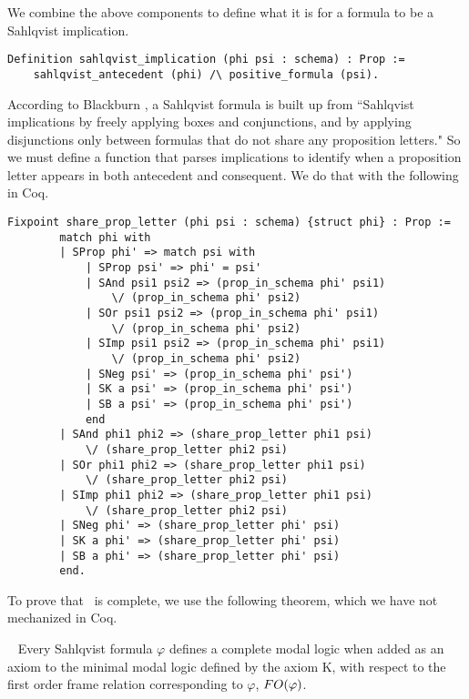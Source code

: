We combine the above components to define what it is for a formula to be a Sahlqvist implication.

\begin{tcolorbox}
	\begin{lstlisting}[language=Coq]
Definition sahlqvist_implication (phi psi : schema) : Prop :=
	sahlqvist_antecedent (phi) /\ positive_formula (psi).

\end{lstlisting}
\end{tcolorbox}

According to Blackburn \etal\cite{modal}, a Sahlqvist formula is built up from ``Sahlqvist implications by freely applying boxes and conjunctions, and by applying disjunctions only between formulas that do not share any proposition letters." So we must define a function that parses implications to identify when a proposition letter appears in both antecedent and consequent. We do that with the following in Coq.

\begin{tcolorbox}
	\begin{lstlisting}[language=Coq]
	Fixpoint share_prop_letter (phi psi : schema) {struct phi} : Prop :=
		match phi with
		| SProp phi' => match psi with
			| SProp psi' => phi' = psi'
			| SAnd psi1 psi2 => (prop_in_schema phi' psi1)
			 	\/ (prop_in_schema phi' psi2)
			| SOr psi1 psi2 => (prop_in_schema phi' psi1) 
				\/ (prop_in_schema phi' psi2)
			| SImp psi1 psi2 => (prop_in_schema phi' psi1) 
				\/ (prop_in_schema phi' psi2)
			| SNeg psi' => (prop_in_schema phi' psi')
			| SK a psi' => (prop_in_schema phi' psi')
			| SB a psi' => (prop_in_schema phi' psi')
			end
		| SAnd phi1 phi2 => (share_prop_letter phi1 psi) 
			\/ (share_prop_letter phi2 psi)
		| SOr phi1 phi2 => (share_prop_letter phi1 psi) 
			\/ (share_prop_letter phi2 psi)
		| SImp phi1 phi2 => (share_prop_letter phi1 psi) 
			\/ (share_prop_letter phi2 psi)
		| SNeg phi' => (share_prop_letter phi' psi)
		| SK a phi' => (share_prop_letter phi' psi)
		| SB a phi' => (share_prop_letter phi' psi)
		end.
	\end{lstlisting}
\end{tcolorbox}



To prove that \DASL\ is complete, we use the following theorem, which we have not mechanized in Coq.

\begin{theorem}~\label{thm:sahlqvist}
	Every Sahlqvist formula $\varphi$ defines a complete modal logic when added as an axiom to the minimal modal logic defined by the axiom K, with respect to the first order frame relation corresponding to $\varphi$,  $\mathnormal{FO}(\varphi)$.
\end{theorem}

